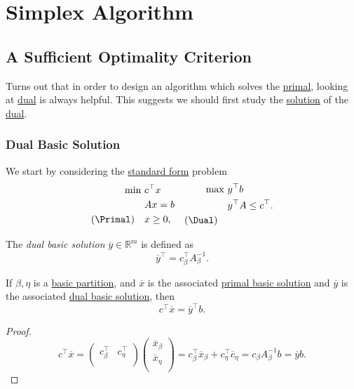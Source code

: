 \chapter{Simplex Algorithm}
\section{A Sufficient Optimality Criterion}
Turns out that in order to design an algorithm which solves the \hyperref[def:primal]{primal}, looking at \hyperref[def:dual]{dual} is always helpful. This suggests we should first study the \hyperref[def:solution]{solution} of the \hyperref[def:dual]{dual}.

\subsection{Dual Basic Solution}
We start by considering the \hyperref[def:standard-form]{standard form} problem
\[
	\begin{aligned}
		\min~          & c^{\top}x \\
		               & Ax = b    \\
		(\Primal)\quad & x\geq  0,
	\end{aligned}\quad \begin{aligned}
		\max ~       & y^{\top}b               \\
		             & y^{\top}A\leq c^{\top}. \\
		(\Dual)\quad &
	\end{aligned}
\]

\begin{definition}\label{def:dual-basic-solution}
	The \emph{dual basic solution} \(\overline{y}\in \mathbb{R}^m\) is defined as
	\[
		\overline{y}^{\top} = c_{\beta}^{\top} A^{-1}_{\beta}.
	\]
\end{definition}

\begin{lemma}\label{lma:lec7-1}
	If \(\beta, \eta\) is a \hyperref[def:basic-partition]{basic partition}, and \(\overline{x}\) is the associated \hyperref[def:basic-solution]{primal basic solution}
	and \(\overline{y}\) is the associated \hyperref[def:dual-basic-solution]{dual basic solution}, then
	\[
		c^{\top}\overline{x} = \overline{y}^{\top} b.
	\]
\end{lemma}
\begin{proof}
	\[
		c^{\top}\overline{x} = \begin{pmatrix}
			c^{\top}_{\beta} & c^{\top}_{\eta} \\
		\end{pmatrix}\begin{pmatrix}
			\overline{x}_{\beta} \\
			\overline{x}_{\eta}  \\
		\end{pmatrix}= c_{\beta}^{\top} \overline{x}_{\beta}+ c_{\eta}^{\top} \overline{c}_{\eta} = c_{\beta} A^{-1}_{\beta}b = \overline{y}b.
	\]
\end{proof}

